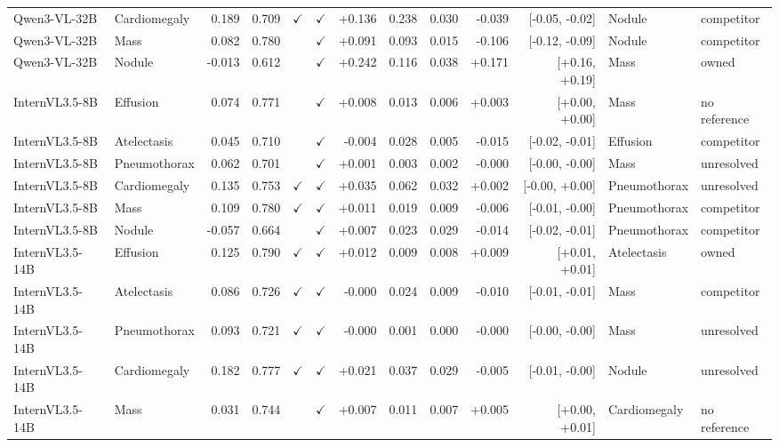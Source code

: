 \begin{longtable}{llrrccrrrrrll}
Qwen3-VL-32B & Cardiomegaly & 0.189 & 0.709 & $\checkmark$ & $\checkmark$ & +0.136 & 0.238 & 0.030 & -0.039 & [-0.05, -0.02] & Nodule & competitor \\
Qwen3-VL-32B & Mass & 0.082 & 0.780 &  & $\checkmark$ & +0.091 & 0.093 & 0.015 & -0.106 & [-0.12, -0.09] & Nodule & competitor \\
\rowcolor{cfSlate2}Qwen3-VL-32B & Nodule & -0.013 & 0.612 &  & $\checkmark$ & +0.242 & 0.116 & 0.038 & +0.171 & [+0.16, +0.19] & Mass & owned \\
InternVL3.5-8B & Effusion & 0.074 & 0.771 &  & $\checkmark$ & +0.008 & 0.013 & 0.006 & +0.003 & [+0.00, +0.00] & Mass & no reference \\
InternVL3.5-8B & Atelectasis & 0.045 & 0.710 &  & $\checkmark$ & -0.004 & 0.028 & 0.005 & -0.015 & [-0.02, -0.01] & Effusion & competitor \\
InternVL3.5-8B & Pneumothorax & 0.062 & 0.701 &  & $\checkmark$ & +0.001 & 0.003 & 0.002 & -0.000 & [-0.00, -0.00] & Mass & unresolved \\
InternVL3.5-8B & Cardiomegaly & 0.135 & 0.753 & $\checkmark$ & $\checkmark$ & +0.035 & 0.062 & 0.032 & +0.002 & [-0.00, +0.00] & Pneumothorax & unresolved \\
InternVL3.5-8B & Mass & 0.109 & 0.780 & $\checkmark$ & $\checkmark$ & +0.011 & 0.019 & 0.009 & -0.006 & [-0.01, -0.00] & Pneumothorax & competitor \\
InternVL3.5-8B & Nodule & -0.057 & 0.664 &  & $\checkmark$ & +0.007 & 0.023 & 0.029 & -0.014 & [-0.02, -0.01] & Pneumothorax & competitor \\
\rowcolor{cfSlate2}InternVL3.5-14B & Effusion & 0.125 & 0.790 & $\checkmark$ & $\checkmark$ & +0.012 & 0.009 & 0.008 & +0.009 & [+0.01, +0.01] & Atelectasis & owned \\
InternVL3.5-14B & Atelectasis & 0.086 & 0.726 & $\checkmark$ & $\checkmark$ & -0.000 & 0.024 & 0.009 & -0.010 & [-0.01, -0.01] & Mass & competitor \\
InternVL3.5-14B & Pneumothorax & 0.093 & 0.721 & $\checkmark$ & $\checkmark$ & -0.000 & 0.001 & 0.000 & -0.000 & [-0.00, -0.00] & Mass & unresolved \\
InternVL3.5-14B & Cardiomegaly & 0.182 & 0.777 & $\checkmark$ & $\checkmark$ & +0.021 & 0.037 & 0.029 & -0.005 & [-0.01, -0.00] & Nodule & unresolved \\
InternVL3.5-14B & Mass & 0.031 & 0.744 &  & $\checkmark$ & +0.007 & 0.011 & 0.007 & +0.005 & [+0.00, +0.01] & Cardiomegaly & no reference \\

\end{longtable}
